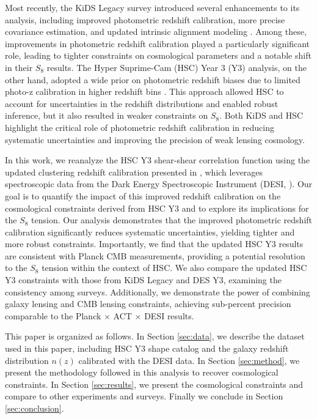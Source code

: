 Most recently, the KiDS Legacy survey introduced several enhancements to its analysis, including improved photometric redshift calibration, more precise covariance estimation, and updated intrinsic alignment modeling \citep{Wright2025_KiDSLegacy}. Among these, improvements in photometric redshift calibration played a particularly significant role, leading to tighter constraints on cosmological parameters and a notable shift in their $S_8$ results. The Hyper Suprime-Cam (HSC) Year 3 (Y3) analysis, on the other hand, adopted a wide prior on photometric redshift biases due to limited photo-z calibration in higher redshift bins \citep{Li2023_HSCY3_CosmicShear, Dalal2023CosmoShearHSC}. This approach allowed HSC to account for uncertainties in the redshift distributions and enabled robust inference, but it also resulted in weaker constraints on $S_8$. Both KiDS and HSC highlight the critical role of photometric redshift calibration in reducing systematic uncertainties and improving the precision of weak lensing cosmology.

In this work, we reanalyze the HSC Y3 shear-shear correlation function using the updated clustering redshift calibration presented in \cite{ChoppinDeJanvry2025a}, which leverages spectroscopic data from the Dark Energy Spectroscopic Instrument (DESI, \cite{DESI2016b.Instr, DESI2022.KP1.Instr}). Our goal is to quantify the impact of this improved redshift calibration on the cosmological constraints derived from HSC Y3 and to explore its implications for the $S_8$ tension. Our analysis demonstrates that the improved photometric redshift calibration significantly reduces systematic uncertainties, yielding tighter and more robust constraints. Importantly, we find that the updated HSC Y3 results are consistent with Planck CMB measurements, providing a potential resolution to the $S_8$ tension within the context of HSC. We also compare the updated HSC Y3 constraints with those from KiDS Legacy and DES Y3, examining the consistency among surveys. Additionally, we demonstrate the power of combining galaxy lensing and CMB lensing constraints, achieving sub-percent precision comparable to the Planck $\times$ ACT $\times$ DESI results.

This paper is organized as follows. In Section \ref{sec:data}, we describe the dataset used in this paper, including HSC Y3 shape catalog and the galaxy redshift distribution $n(z)$ calibrated with the DESI data. In Section \ref{sec:method}, we present the methodology followed in this analysis to recover cosmological constraints. In Section \ref{sec:results}, we present the cosmological constraints and compare to other experiments and surveys. Finally we conclude in Section \ref{sec:conclusion}.

